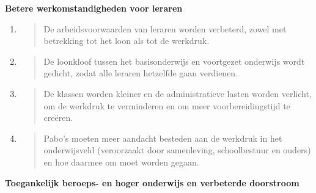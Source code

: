 \textbf{Betere werkomstandigheden voor leraren}

\begin{enumerate}
\def\labelenumi{\arabic{enumi}.}
\item
  \begin{quote}
  De arbeidsvoorwaarden van leraren worden verbeterd, zowel met
  betrekking tot het loon als tot de werkdruk.
  \end{quote}
\item
  \begin{quote}
  De loonkloof tussen het basisonderwijs en voortgezet onderwijs wordt
  gedicht, zodat alle leraren hetzelfde gaan verdienen.
  \end{quote}
\item
  \begin{quote}
  De klassen worden kleiner en de administratieve lasten worden
  verlicht, om de werkdruk te verminderen en om meer voorbereidingstijd
  te creëren.
  \end{quote}
\item
  \begin{quote}
  Pabo's moeten meer aandacht besteden aan de werkdruk in het
  onderwijsveld (veroorzaakt door samenleving, schoolbestuur en ouders)
  en hoe daarmee om moet worden gegaan.
  \end{quote}
\end{enumerate}

\textbf{Toegankelijk beroeps- en hoger onderwijs en verbeterde
doorstroom}

